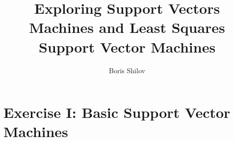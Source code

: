 \documentclass[10pt,a4paper]{article}
\title{Exploring Support Vectors Machines and Least Squares Support Vector Machines}
\author{Boris Shilov}
\begin{document}
\maketitle
\section{Exercise I: Basic Support Vector Machines}
\end{document}
